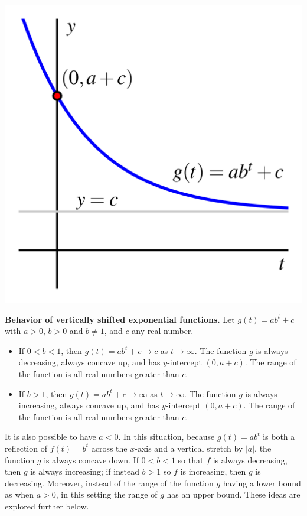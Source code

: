 \documentclass[nooutcomes]{ximera}
\begin{document}
\begin{image}
\includegraphics{modeling-vert-transl-c.jpg}
\end{image}

\begin{callout}
\textbf{\Large Behavior of vertically shifted exponential functions.}
Let $g(t) = ab^t + c$ with $a > 0$, $b > 0$ and $b \ne 1$, and $c$ any real number.
\begin{itemize}
\item If $0 < b < 1$, then $g(t) = ab^t + c \to c$ as $t \to \infty$.  The function $g$ is always decreasing, always concave up, and has $y$-intercept $(0,a+c)$.  The range of the function is all real numbers greater than $c$.
\item If $b > 1$, then $g(t) = ab^t + c \to \infty$ as $t \to \infty$.  The function $g$ is always increasing, always concave up, and has $y$-intercept $(0,a+c)$.  The range of the function is all real numbers greater than $c$.
\end{itemize}
\end{callout}


It is also possible to have $a < 0$.  In this situation, because $g(t) = ab^t$ is both a reflection of $f(t) = b^t$ across the $x$-axis and a vertical stretch by $|a|$, the function $g$ is always concave down.  If $0 < b < 1$ so that $f$ is always decreasing, then $g$ is always increasing; if instead $b > 1$ so $f$ is increasing, then $g$ is decreasing.  Moreover, instead of the range of the function $g$ having a lower bound as when $a > 0$, in this setting the range of $g$ has an upper bound.  These ideas are explored further below.
\end{document}

